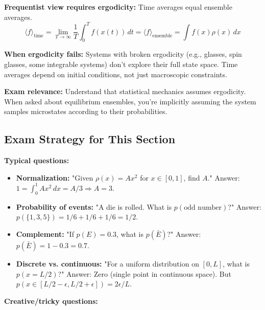 \documentclass[9pt,twocoloumn]{article}
\begin{document}
\textbf{Frequentist view requires ergodicity:} Time averages equal ensemble averages.
\begin{equation}
\langle f \rangle_{\text{time}} = \lim_{T \to \infty} \frac{1}{T} \int_0^T f(x(t)) \, dt = \langle f \rangle_{\text{ensemble}} = \int f(x) \rho(x) \, dx
\end{equation}

\textbf{When ergodicity fails:} Systems with broken ergodicity (e.g., glasses, spin glasses, some integrable systems) don't explore their full state space. Time averages depend on initial conditions, not just macroscopic constraints.

\textbf{Exam relevance:} Understand that statistical mechanics assumes ergodicity. When asked about equilibrium ensembles, you're implicitly assuming the system samples microstates according to their probabilities.

\subsection{Exam Strategy for This Section}

\textbf{Typical questions:}

\begin{itemize}
    \item \textbf{Normalization:} "Given $\rho(x) = A x^2$ for $x \in [0, 1]$, find $A$." Answer: $1 = \int_0^1 A x^2 \, dx = A/3 \Rightarrow A = 3$.
    
    \item \textbf{Probability of events:} "A die is rolled. What is $p(\text{odd number})$?" Answer: $p(\{1, 3, 5\}) = 1/6 + 1/6 + 1/6 = 1/2$.
    
    \item \textbf{Complement:} "If $p(E) = 0.3$, what is $p(\bar{E})$?" Answer: $p(\bar{E}) = 1 - 0.3 = 0.7$.
    
    \item \textbf{Discrete vs. continuous:} "For a uniform distribution on $[0, L]$, what is $p(x = L/2)$?" Answer: Zero (single point in continuous space). But $p(x \in [L/2 - \epsilon, L/2 + \epsilon]) = 2\epsilon/L$.
\end{itemize}

\textbf{Creative/tricky questions:}
\end{document}
